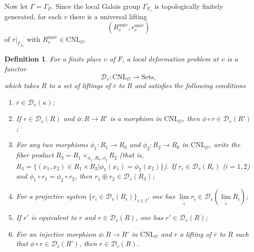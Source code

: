 \documentclass[12pt,oneside,reqno]{amsart}
\theoremstyle{plain}
\newtheorem{definition}[theorem]{Definition}
\begin{document}
	
	Now let $\Gamma=\Gamma_F$.
	Since the local Galois group
	$\Gamma_{F_v}$
	is topologically finitely generated,
	for each $v$
	there is a universal lifting
	\[
	(R^\mathrm{univ}_v,r^\mathrm{univ}_v)
	\]
	of
	$\overline{r}|_{\Gamma_{F_v}}$
	with
	$R^\mathrm{univ}_v\in
	\mathrm{CNL}_\mathcal{O}$.
	
	
	
	
	
	
	
	
	
	\begin{definition}\label{local deformation problem}
		For a finite place $v$ of $F$, a \emph{local deformation problem at $v$}
		is a functor
		\[
		\mathcal{D}_v
		\colon
		\mathrm{CNL}_\mathcal{O}
		\rightarrow
		\mathrm{Sets},
		\]
		which takes $R$ to a set of
		liftings
		of $\overline{r}$ to
		$R$ and
		satisfies the following conditions
		\begin{enumerate}
			\item
			$\overline{r}
			\in
			\mathcal{D}_v(\kappa)$;
			
			\item 
			If
			$r\in
			\mathcal{D}_v(R)$
			and
			$\phi\colon
			R\rightarrow
			R'$
			is a morphism in
			$\mathrm{CNL}_\mathcal{O}$,
			then
			$\phi\circ r
			\in
			\mathcal{D}_v(R')$;
			
			\item 
			For any two morphisms
			$\phi_1\colon
			R_1\rightarrow
			R_0$ and
			$\phi_2\colon
			R_2
			\rightarrow
			R_0$ in
			$\mathrm{CNL}_\mathcal{O}$,
			write the fiber product
			$R_3=R_1\times_{\phi_1,R_0,\phi_2}R_2$
			(that is,
			$R_3=\{(x_1,x_2)\in R_1\times R_2
			|\phi_1(x_1)=\phi_2(x_2)\}$).
			If
			$r_i\in
			\mathcal{D}_v(R_i)$
			($i=1,2$)
			and
			$\phi_1\circ r_1=\phi_2\circ r_2$,
			then
			$r_1\oplus r_2
			\in
			\mathcal{D}_v(R_3)$;
			
			\item 
			For a projective system
			$\{r_i\in\mathcal{D}_v(R_i)\}_{i\in I}$,
			one has
			$\lim\limits_{\overleftarrow{i}}
			r_i
			\in
			\mathcal{D}_v
			(\lim\limits_{\overleftarrow{i}}R_i)$;
			
			\item 
			If $r'$ is equivalent to $r$ and
			$r\in\mathcal{D}_v(R)$,
			one has
			$r'\in\mathcal{D}_v(R)$;
			
			\item 
			For an injective morphism
			$\phi
			\colon
			R
			\rightarrow
			R'$
			in
			$\mathrm{CNL}_\mathcal{O}$
			and
			$r$ a lifting of
			$\overline{r}$ to $R$
			such that
			$\phi\circ r\in
			\mathcal{D}_v(R')$,
			then
			$r\in\mathcal{D}_v(R)$.
		\end{enumerate}
	\end{definition}
	
\end{document}
